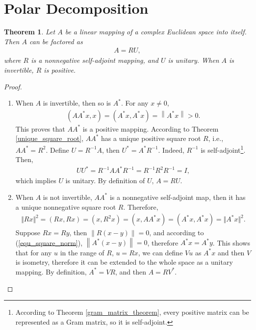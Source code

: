 \documentclass[10pt]{book}
\newtheorem{theorem}{Theorem}[chapter]
\theoremstyle{definition}
\numberwithin{equation}{chapter}
\begin{document}
\section{Polar Decomposition}
\begin{theorem}\label{polar_decomposition_theorem}
Let $A$ be a linear mapping of a complex Euclidean space into itself. Then $A$ can be factored as 
\begin{align}\label{polar_decomposition}
    A = RU,
\end{align}
where $R$ is a nonnegative self-adjoint mapping, and $U$ is unitary. When $A$ is invertible, $R$ is positive.
\end{theorem}
\begin{proof}
~\begin{enumerate}[label=(\alph*)]
    \item When $A$ is invertible, then so is $A^*$. For any $x \neq 0$,
    \begin{align*}
        (A A^* x, x) = (A^* x, A^* x) = \left\|A^* x\right\| > 0.
    \end{align*}
    This proves that $A A^*$ is a positive mapping. According to Theorem \ref{unique_square_root}, $A A^*$ has a unique positive square root $R$, i.e., $A A^* = R^2$. Define $U = R^{-1}A$, then $U^* = A^* R^{-1}$. Indeed, $R^{-1}$ is self-adjoint\footnote{According to Theorem \ref{gram_matrix_theorem}, every positive matrix can be represented as a Gram matrix, so it is self-adjoint.}. Then,
    \begin{align*}
        U U^* = R^{-1}A A^* R^{-1} = R^{-1} R^2 R^{-1} = I,
    \end{align*}
    which implies $U$ is unitary. By definition of $U$, $A = RU$.
    
    \item When $A$ is not invertible, $AA^*$ is a nonnegative self-adjoint map, then it has a unique nonnegative square root $R$. Therefore, 
    \begin{align}\label{equ_square_norm}
        \Vert R x \Vert^2 = (Rx, Rx) = (x, R^2 x) = (x, AA^*x) = (A^*x, A^*x) = \Vert A^*x \Vert^2.
    \end{align}
    Suppose $Rx = Ry$, then $\left\|R (x - y)\right\| = 0$, and according to (\ref{equ_square_norm}), $\left\|A^* (x - y)\right\| = 0$, therefore $A^* x = A^* y$. This shows that for any $u$ in the range of $R$, $u = Rx$, we can define $Vu$ as 
    $A^* x$ and then $V$ is isometry, therefore it can be extended to the whole space as a unitary mapping. By definition, $A^* = VR$, and then $A = RV^*$.
\end{enumerate}
\end{proof}
\end{document}
